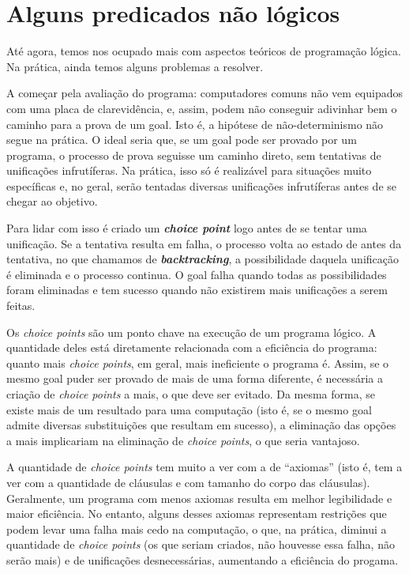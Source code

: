 \documentclass{article}
\theoremstyle{remark}
\begin{document}
\section{Alguns predicados não lógicos}

Até agora, temos nos ocupado mais com aspectos teóricos de programação lógica. Na prática, ainda temos alguns problemas a resolver.

A começar pela avaliação do programa: computadores comuns não vem equipados com uma placa de clarevidência, e, assim, podem não conseguir adivinhar bem o caminho para a prova de um goal. Isto é, a hipótese de não-determinismo não segue na prática. O ideal seria que, se um goal pode ser provado por um programa, o processo de prova seguisse um caminho direto, sem tentativas de unificações infrutíferas. Na prática, isso só é realizável para situações muito específicas e, no geral, serão tentadas
diversas unificações infrutíferas antes de se chegar ao objetivo.

Para lidar com isso é criado um \textbf{\textit{choice point}} logo antes de se tentar uma unificação. Se a tentativa resulta em falha, o processo volta ao estado de antes da tentativa, no que chamamos de \textbf\textit{{backtracking}}, a possibilidade daquela unificação é eliminada e o processo continua. O goal falha quando todas as possibilidades foram eliminadas e tem sucesso quando não existirem mais unificações a serem feitas.

Os \textit{choice points} são um ponto chave na execução de um programa lógico. A quantidade deles está diretamente relacionada com a eficiência do programa: quanto mais \textit{choice points}, em geral, mais ineficiente o programa é. Assim, se o mesmo goal puder ser provado de mais de uma forma diferente, é necessária a criação de \textit{choice points} a mais, o que deve ser evitado. Da mesma forma, se existe mais de um resultado para uma computação (isto é, se o mesmo goal admite diversas substituições que resultam em sucesso), a eliminação das opções a mais implicariam na eliminação de \textit{choice points}, o que seria vantajoso.

A quantidade de \textit{choice points} tem muito a ver com a de ``axiomas'' (isto é, tem a ver com a quantidade de cláusulas e com tamanho do corpo das cláusulas). Geralmente, um programa com menos axiomas resulta em melhor legibilidade e maior eficiência. No entanto, alguns desses axiomas representam restrições que podem levar uma falha mais cedo na computação, o que, na prática, diminui a quantidade de \textit{choice points} (os que seriam criados, não houvesse essa
falha, não serão mais) e de unificações
desnecessárias, aumentando a eficiência do progama.
\end{document}
